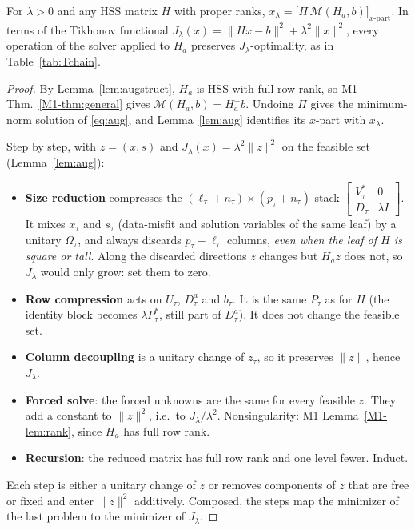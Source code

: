 \begin{theorem}\label{thm:T}
For $\lambda>0$ and any HSS matrix $H$ with proper ranks, $x_\lambda=\big[\Pi\,\mathcal M(H_a,b)\big]_{x\text{-part}}$.
In terms of the Tikhonov functional $J_\lambda(x)=\|Hx-b\|^2+\lambda^2\|x\|^2$, every operation of
the solver applied to $H_a$ preserves $J_\lambda$-optimality, as in Table~\ref{tab:Tchain}.
\end{theorem}
\begin{proof}
By Lemma~\ref{lem:augstruct}, $H_a$ is HSS with full row rank, so M1 Thm.~\ref{M1-thm:general} gives
$\mathcal M(H_a,b)=H_a^+b$. Undoing $\Pi$ gives the minimum-norm solution of \eqref{eq:aug}, and
Lemma~\ref{lem:aug} identifies its $x$-part with $x_\lambda$.

Step by step, with $z=(x,s)$ and $J_\lambda(x)=\lambda^2\|z\|^2$ on the feasible set (Lemma~\ref{lem:aug}):
\begin{itemize}[leftmargin=1.4em,itemsep=2pt]
\item \textbf{Size reduction} compresses the $(\ell_\tau+n_\tau)\times(p_\tau+n_\tau)$ stack
$\left[\begin{smallmatrix}V_\tau^*&0\\D_\tau&\lambda I\end{smallmatrix}\right]$. It mixes $x_\tau$ and $s_\tau$
(data-misfit and solution variables of the same leaf) by a unitary $\Omega_\tau$, and always
discards $p_\tau-\ell_\tau$ columns, \emph{even when the leaf of $H$ is square or tall}. Along the
discarded directions $z$ changes but $H_az$ does not, so $J_\lambda$ would only grow: set them to zero.
\item \textbf{Row compression} acts on $U_\tau$, $D_\tau^a$ and $b_\tau$. It is the same $P_\tau$ as for $H$
(the identity block becomes $\lambda P_\tau^*$, still part of $D_\tau^a$). It does not change the feasible set.
\item \textbf{Column decoupling} is a unitary change of $z_\tau$, so it preserves $\|z\|$, hence $J_\lambda$.
\item \textbf{Forced solve}: the forced unknowns are the same for every feasible $z$. They add a
constant to $\|z\|^2$, i.e.\ to $J_\lambda/\lambda^2$. Nonsingularity: M1 Lemma~\ref{M1-lem:rank}, since $H_a$ has full
row rank.
\item \textbf{Recursion}: the reduced matrix has full row rank and one level fewer. Induct.
\end{itemize}
Each step is either a unitary change of $z$ or removes components of $z$ that are free or fixed and
enter $\|z\|^2$ additively. Composed, the steps map the minimizer of the last problem to the minimizer
of $J_\lambda$.
\end{proof}

